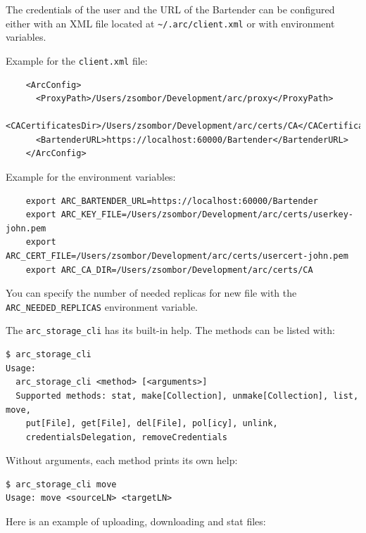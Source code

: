 \documentclass{book}
\begin{document}
The credentials of the user and the URL of the Bartender can be configured either with an XML file located at \verb!~/.arc/client.xml! or with environment variables.

Example for the \verb!client.xml! file:

\begin{verbatim}
    <ArcConfig>
      <ProxyPath>/Users/zsombor/Development/arc/proxy</ProxyPath>
      <CACertificatesDir>/Users/zsombor/Development/arc/certs/CA</CACertificatesDir>
      <BartenderURL>https://localhost:60000/Bartender</BartenderURL>
    </ArcConfig>
\end{verbatim}

Example for the environment variables:

\begin{verbatim}
    export ARC_BARTENDER_URL=https://localhost:60000/Bartender
    export ARC_KEY_FILE=/Users/zsombor/Development/arc/certs/userkey-john.pem
    export ARC_CERT_FILE=/Users/zsombor/Development/arc/certs/usercert-john.pem 
    export ARC_CA_DIR=/Users/zsombor/Development/arc/certs/CA    
\end{verbatim}

You can specify the number of needed replicas for new file with the \verb!ARC_NEEDED_REPLICAS! environment variable.

The \verb!arc_storage_cli! has its built-in help. The methods can be listed with:

\begin{verbatim}
$ arc_storage_cli
Usage:
  arc_storage_cli <method> [<arguments>]
  Supported methods: stat, make[Collection], unmake[Collection], list, move,
    put[File], get[File], del[File], pol[icy], unlink,
    credentialsDelegation, removeCredentials
\end{verbatim}
Without arguments, each method prints its own help:
\begin{verbatim}
$ arc_storage_cli move
Usage: move <sourceLN> <targetLN>
\end{verbatim}

Here is an example of uploading, downloading and stat files:
\end{document}
